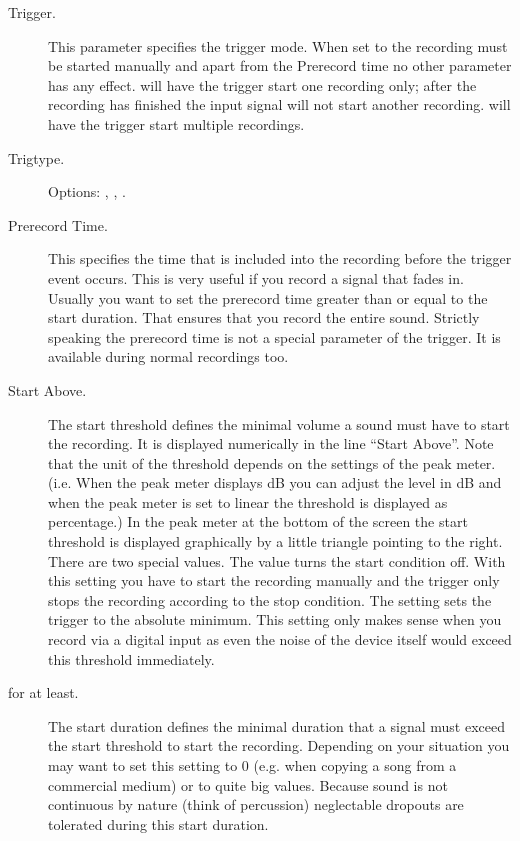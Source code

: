   \begin{description}
  \item[Trigger.]
    This parameter specifies the trigger mode.  When set to 
    the recording must be started manually and apart from the Prerecord time no
    other parameter has any effect.   will have the trigger start
    one recording only; after the recording has finished the input signal will
    not start another recording.  will have the trigger start 
    multiple recordings.
    
  \item[Trigtype.]
    Options: , , .
    
  \item[Prerecord Time.]
    This specifies the time that is included into the recording before the
    trigger event occurs. This is very useful if you record a signal that
    fades in. Usually you want to set the prerecord time greater than or
    equal to the start duration. That ensures that you record the entire
    sound. Strictly speaking the prerecord time is not a special parameter
    of the trigger. It is available during normal recordings too.
    
  \item[Start Above.]
    The start threshold defines the minimal volume a sound must have to start the
    recording. It is displayed numerically in the line ``Start Above''. Note that
    the unit of the threshold depends on the settings of the peak meter. (i.e.
    When the peak meter displays dB you can adjust the level in dB and when the
    peak meter is set to linear the threshold is displayed as percentage.) In the
    peak meter at the bottom of the screen the start threshold is displayed
    graphically by a little triangle pointing to the right. There are two special
    values. The value  turns the start condition off.  With this
    setting you have to start the recording manually and the trigger only stops
    the recording according to the stop condition. The setting 
    sets the trigger to the absolute minimum. This setting only makes sense when
    you record via a digital input as even the noise of the device itself would
    exceed this threshold immediately.
    
  \item[for at least.]
    The start duration defines the minimal duration that a signal must exceed the
    start threshold to start the recording. Depending on your situation you may
    want to set this setting to 0 (e.g. when copying a song from a commercial
    medium) or to quite big values. Because sound is not continuous by nature
    (think of percussion) neglectable dropouts are tolerated during this start
    duration.
    

\end{description}
